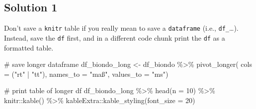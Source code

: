 \documentclass[
  letterpaper,
  DIV=11]{scrartcl}
\newenvironment{Shaded}{\begin{snugshade}}{\end{snugshade}}
\newcommand{\AttributeTok}[1]{\textcolor[rgb]{0.40,0.45,0.13}{#1}}
\newcommand{\CommentTok}[1]{\textcolor[rgb]{0.37,0.37,0.37}{#1}}
\newcommand{\DecValTok}[1]{\textcolor[rgb]{0.68,0.00,0.00}{#1}}
\newcommand{\FunctionTok}[1]{\textcolor[rgb]{0.28,0.35,0.67}{#1}}
\newcommand{\NormalTok}[1]{\textcolor[rgb]{0.00,0.23,0.31}{#1}}
\newcommand{\OtherTok}[1]{\textcolor[rgb]{0.00,0.23,0.31}{#1}}
\newcommand{\SpecialCharTok}[1]{\textcolor[rgb]{0.37,0.37,0.37}{#1}}
\newcommand{\StringTok}[1]{\textcolor[rgb]{0.13,0.47,0.30}{#1}}
\begin{document}
\subsection{Solution 1}

Don't save a \texttt{knitr} table if you really mean to save a
\texttt{dataframe} (i.e., \texttt{df\_}\ldots). Instead, save the
\texttt{df} first, and in a different code chunk print the \texttt{df}
as a formatted table.

\begin{Shaded}
\begin{Highlighting}[numbers=left,,]
\CommentTok{\# save longer dataframe}
\NormalTok{df\_biondo\_long }\OtherTok{\textless{}{-}}\NormalTok{ df\_biondo }\SpecialCharTok{\%\textgreater{}\%} 
  \FunctionTok{pivot\_longer}\NormalTok{(}
    \AttributeTok{cols =}\NormalTok{ (}\StringTok{"rt"} \SpecialCharTok{|} \StringTok{"tt"}\NormalTok{),}
    \AttributeTok{names\_to =} \StringTok{"maß"}\NormalTok{,}
    \AttributeTok{values\_to =} \StringTok{"ms"}\NormalTok{)}
\end{Highlighting}
\end{Shaded}

\begin{Shaded}
\begin{Highlighting}[numbers=left,,]
\CommentTok{\# print table of longer df}
\NormalTok{df\_biondo\_long }\SpecialCharTok{\%\textgreater{}\%} 
  \FunctionTok{head}\NormalTok{(}\AttributeTok{n =} \DecValTok{10}\NormalTok{) }\SpecialCharTok{\%\textgreater{}\%} 
\NormalTok{  knitr}\SpecialCharTok{::}\FunctionTok{kable}\NormalTok{() }\SpecialCharTok{\%\textgreater{}\%} 
\NormalTok{  kableExtra}\SpecialCharTok{::}\FunctionTok{kable\_styling}\NormalTok{(}\AttributeTok{font\_size =} \DecValTok{20}\NormalTok{)}
\end{Highlighting}
\end{Shaded}
\end{document}
